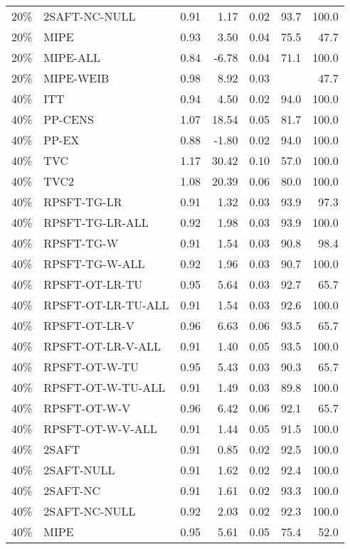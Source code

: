 \begin{table}[ht]
{\begin{tabular}{llrrrrr}
  20\% & 2SAFT-NC-NULL & 0.91 & 1.17 & 0.02 & 93.7 & 100.0 \\ 
  20\% & MIPE & 0.93 & 3.50 & 0.04 & 75.5 & 47.7 \\ 
  20\% & MIPE-ALL & 0.84 & -6.78 & 0.04 & 71.1 & 100.0 \\ 
  20\% & MIPE-WEIB & 0.98 & 8.92 & 0.03 &  & 47.7 \\ 
   \hline
40\% & ITT & 0.94 & 4.50 & 0.02 & 94.0 & 100.0 \\ 
  40\% & PP-CENS & 1.07 & 18.54 & 0.05 & 81.7 & 100.0 \\ 
  40\% & PP-EX & 0.88 & -1.80 & 0.02 & 94.0 & 100.0 \\ 
  40\% & TVC & 1.17 & 30.42 & 0.10 & 57.0 & 100.0 \\ 
  40\% & TVC2 & 1.08 & 20.39 & 0.06 & 80.0 & 100.0 \\ 
   \hline
40\% & RPSFT-TG-LR & 0.91 & 1.32 & 0.03 & 93.9 & 97.3 \\ 
  40\% & RPSFT-TG-LR-ALL & 0.92 & 1.98 & 0.03 & 93.9 & 100.0 \\ 
  40\% & RPSFT-TG-W & 0.91 & 1.54 & 0.03 & 90.8 & 98.4 \\ 
  40\% & RPSFT-TG-W-ALL & 0.92 & 1.96 & 0.03 & 90.7 & 100.0 \\ 
  40\% & RPSFT-OT-LR-TU & 0.95 & 5.64 & 0.03 & 92.7 & 65.7 \\ 
  40\% & RPSFT-OT-LR-TU-ALL & 0.91 & 1.54 & 0.03 & 92.6 & 100.0 \\ 
  40\% & RPSFT-OT-LR-V & 0.96 & 6.63 & 0.06 & 93.5 & 65.7 \\ 
  40\% & RPSFT-OT-LR-V-ALL & 0.91 & 1.40 & 0.05 & 93.5 & 100.0 \\ 
   \hline
40\% & RPSFT-OT-W-TU & 0.95 & 5.43 & 0.03 & 90.3 & 65.7 \\ 
  40\% & RPSFT-OT-W-TU-ALL & 0.91 & 1.49 & 0.03 & 89.8 & 100.0 \\ 
  40\% & RPSFT-OT-W-V & 0.96 & 6.42 & 0.06 & 92.1 & 65.7 \\ 
  40\% & RPSFT-OT-W-V-ALL & 0.91 & 1.44 & 0.05 & 91.5 & 100.0 \\ 
   \hline
40\% & 2SAFT & 0.91 & 0.85 & 0.02 & 92.5 & 100.0 \\ 
  40\% & 2SAFT-NULL & 0.91 & 1.62 & 0.02 & 92.4 & 100.0 \\ 
  40\% & 2SAFT-NC & 0.91 & 1.61 & 0.02 & 93.3 & 100.0 \\ 
  40\% & 2SAFT-NC-NULL & 0.92 & 2.03 & 0.02 & 92.3 & 100.0 \\ 
  40\% & MIPE & 0.95 & 5.61 & 0.05 & 75.4 & 52.0 \\ 

\end{tabular}}
\end{table}
